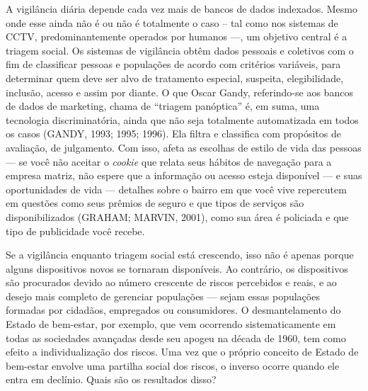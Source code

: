 A vigilância diária depende cada vez mais de bancos de dados indexados.
Mesmo onde esse ainda não é ou não é totalmente o caso -- tal como nos
sistemas de CCTV, predominantemente operados por humanos ---, um
objetivo central é a triagem social. Os sistemas de vigilância obtêm
dados pessoais e coletivos com o fim de classificar pessoas e populações
de acordo com critérios variáveis, para determinar quem deve ser alvo de
tratamento especial, suspeita, elegibilidade, inclusão, acesso e assim
por diante. O que Oscar Gandy, referindo-se aos bancos de dados de
marketing, chama de ``triagem panóptica'' é, em suma, uma tecnologia
discriminatória, ainda que não seja totalmente automatizada em todos os
casos (GANDY, 1993; 1995; 1996). Ela filtra e classifica com propósitos
de avaliação, de julgamento. Com isso, afeta as escolhas de estilo de
vida das pessoas --- se você não aceitar o \emph{cookie} que relata seus
hábitos de navegação para a empresa matriz, não espere que a informação
ou acesso esteja disponível --- e suas oportunidades de vida ---
detalhes sobre o bairro em que você vive repercutem em questões como
seus prêmios de seguro e que tipos de serviços são disponibilizados
(GRAHAM; MARVIN, 2001), como sua área é policiada e que tipo de
publicidade você recebe.

Se a vigilância enquanto triagem social está crescendo, isso não é
apenas porque alguns dispositivos novos se tornaram disponíveis. Ao
contrário, os dispositivos são procurados devido ao número crescente de
riscos percebidos e reais, e ao desejo mais completo de gerenciar
populações --- sejam essas populações formadas por cidadãos, empregados
ou consumidores. O desmantelamento do Estado de bem-estar, por exemplo,
que vem ocorrendo sistematicamente em todas as sociedades avançadas
desde seu apogeu na década de 1960, tem como efeito a individualização
dos riscos. Uma vez que o próprio conceito de Estado de bem-estar
envolve uma partilha social dos riscos, o inverso ocorre quando ele
entra em declínio. Quais são os resultados disso?

